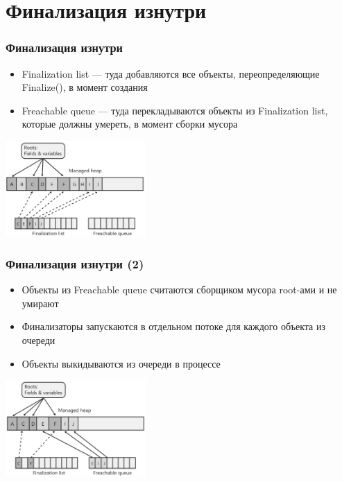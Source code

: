 \documentclass{../../slides-style}
\begin{document}
    \section{Финализация изнутри}

    \begin{frame}
        \frametitle{Финализация изнутри}
        \begin{itemize}
            \item Finalization list --- туда добавляются все объекты, переопределяющие Finalize(), в момент создания
            \item Freachable queue --- туда перекладываются объекты из Finalization list, которые должны умереть, в момент сборки мусора
        \end{itemize}
        \begin{center}
            \includegraphics[width=0.4\textwidth]{finalizationList.png}
        \end{center}
    \end{frame}

    \begin{frame}
        \frametitle{Финализация изнутри (2)}
        \begin{itemize}
            \item Объекты из Freachable queue считаются сборщиком мусора root-ами и не умирают
            \item Финализаторы запускаются в отдельном потоке для каждого объекта из очереди
            \item Объекты выкидываются из очереди в процессе
        \end{itemize}
        \begin{center}
            \includegraphics[width=0.4\textwidth]{freachableQueue.png}
        \end{center}
    \end{frame}
\end{document}
